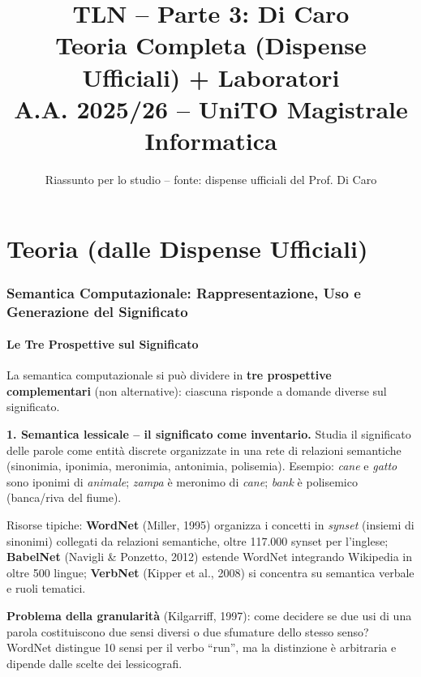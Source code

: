 \documentclass[12pt,a4paper]{article}
\title{\textbf{TLN -- Parte 3: Di Caro}\\[0.3em]
\large Teoria Completa (Dispense Ufficiali) + Laboratori\\[0.2em]
\normalsize A.A. 2025/26 -- UniTO Magistrale Informatica}
\author{Riassunto per lo studio -- fonte: dispense ufficiali del Prof. Di Caro}
\date{}
\begin{document}
\maketitle
\tableofcontents
\newpage

\part{Teoria (dalle Dispense Ufficiali)}

\section{Semantica Computazionale: Rappresentazione, Uso e Generazione del Significato}

\subsection{Le Tre Prospettive sul Significato}

\begin{defbox}
La semantica computazionale si pu\`o dividere in \textbf{tre prospettive complementari} (non alternative): ciascuna risponde a domande diverse sul significato.
\end{defbox}

\textbf{1. Semantica lessicale -- il significato come inventario.} Studia il significato delle parole come entit\`a discrete organizzate in una rete di relazioni semantiche (sinonimia, iponimia, meronimia, antonimia, polisemia). Esempio: \textit{cane} e \textit{gatto} sono iponimi di \textit{animale}; \textit{zampa} \`e meronimo di \textit{cane}; \textit{bank} \`e polisemico (banca/riva del fiume).

Risorse tipiche: \textbf{WordNet} (Miller, 1995) organizza i concetti in \emph{synset} (insiemi di sinonimi) collegati da relazioni semantiche, oltre 117.000 synset per l'inglese; \textbf{BabelNet} (Navigli \& Ponzetto, 2012) estende WordNet integrando Wikipedia in oltre 500 lingue; \textbf{VerbNet} (Kipper et al., 2008) si concentra su semantica verbale e ruoli tematici.

\begin{quizbox}
\textbf{Problema della granularit\`a} (Kilgarriff, 1997): come decidere se due usi di una parola costituiscono due sensi diversi o due sfumature dello stesso senso? WordNet distingue 10 sensi per il verbo ``run'', ma la distinzione \`e arbitraria e dipende dalle scelte dei lessicografi.
\end{quizbox}
\end{document}
